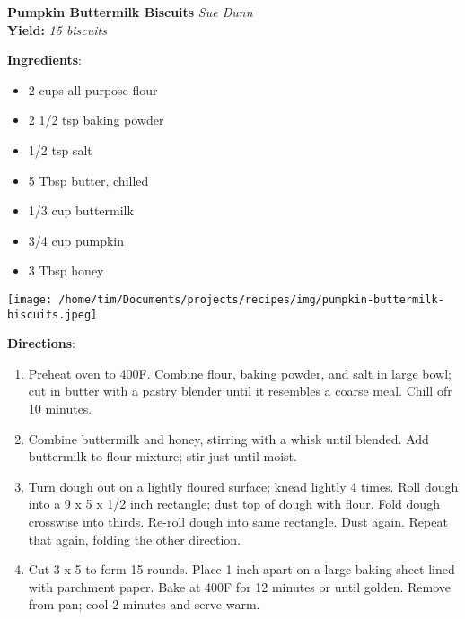 \documentclass[11pt, twoside, openany]{book}
\begin{document}
\noindent\begin{minipage}[t]{\linewidth}%
{\Large\textbf{Pumpkin Buttermilk Biscuits}} \label{pumpkin-buttermilk-biscuits}\hfill\textit{Sue Dunn}\\
\textbf{Yield:} \textit{15 biscuits}\\
\noindent\begin{minipage}[t]{0.78\linewidth}%
\textbf{Ingredients}:\vspace{-3mm}
\begin{multicols}{2}
\begin{itemize}\setlength\itemsep{-1mm}
\item 2 cups all-purpose flour
\item 2 1/2 tsp baking powder
\item 1/2 tsp salt
\item 5 Tbsp butter, chilled
\item 1/3 cup buttermilk
\item 3/4 cup pumpkin
\item 3 Tbsp honey
\end{itemize}
\end{multicols}
\end{minipage}
\noindent\begin{minipage}[t]{0.18\linewidth}
\centering \strut\vspace*{-\baselineskip}\newline
\texttt{[image: /home/tim/Documents/projects/recipes/img/pumpkin-buttermilk-biscuits.jpeg]}\\
\end{minipage}\vspace{3mm}
\textbf{Directions}:
\vspace{-3mm}\begin{enumerate}\setlength\itemsep{-1mm}
\item Preheat oven to 400F. Combine flour, baking powder, and salt in large bowl; cut in butter with a pastry blender until it resembles a coarse meal. Chill ofr 10 minutes.
\item Combine buttermilk and honey, stirring with a whisk until blended. Add buttermilk to flour mixture; stir just until moist.
\item Turn dough out on a lightly floured surface; knead lightly 4 times. Roll dough into a 9 x 5 x 1/2 inch rectangle; dust top of dough with flour. Fold dough crosswise into thirds. Re-roll dough into same rectangle. Dust again. Repeat that again, folding the other direction.
\item Cut 3 x 5 to form 15 rounds. Place 1 inch apart on a large baking sheet lined with parchment paper. Bake at 400F for 12 minutes or until golden. Remove from pan; cool 2 minutes and serve warm.
\end{enumerate}
\end{minipage}\vspace{8mm}
\end{document}
